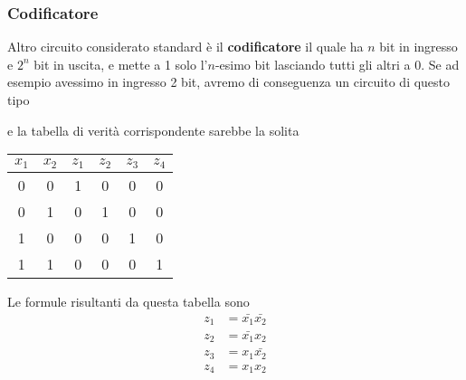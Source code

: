 \subsubsection{Codificatore}
Altro circuito considerato standard è il \textbf{codificatore} il quale ha $n$ bit in ingresso e
$2^n$ bit in uscita, e mette a 1 solo l'$n$-esimo bit lasciando tutti gli altri a 0. Se ad esempio
avessimo in ingresso 2 bit, avremo di conseguenza un circuito di questo tipo
\begin{center}
\end{center}
e la tabella di verità corrispondente sarebbe la solita
\begin{center}
	\begin{tabular}{c c | c c c c}
		$x_1$ & $x_2$ & $z_1$ & $z_2$ & $z_3$ & $z_4$ \\ \hline
		0     & 0     & 1     & 0     & 0     & 0     \\
		0     & 1     & 0     & 1     & 0     & 0     \\
		1     & 0     & 0     & 0     & 1     & 0     \\
		1     & 1     & 0     & 0     & 0     & 1
	\end{tabular}
\end{center}
Le formule risultanti da questa tabella sono
\begin{align*}
	z_1 & = \bar{x_1} \bar{x_2} \\
	z_2 & = \bar{x_1} x_2       \\
	z_3 & = x_1 \bar{x_2}       \\
	z_4 & = x_1 x_2
\end{align*}